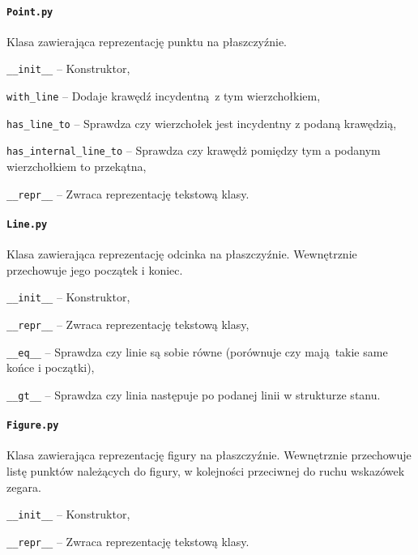 \documentclass[12pt]{article}
\let\tempone\itemize
\let\temptwo\enditemize
\renewenvironment{itemize}{\tempone\setlength{\itemsep}{0cm}}{\temptwo}
\begin{document}
		\paragraph{\lstinline|Point.py|}
			Klasa zawierająca reprezentację punktu na płaszczyźnie.
			\begin{itemize}
				\item \lstinline|__init__| -- Konstruktor,
				\item \lstinline|with_line| -- Dodaje krawędź incydentną z tym wierzchołkiem,
				\item \lstinline|has_line_to| -- Sprawdza czy wierzchołek jest incydentny z podaną krawędzią,
				\item \lstinline|has_internal_line_to| -- Sprawdza czy krawędż pomiędzy tym a podanym wierzchołkiem to przekątna, 
				\item \lstinline|__repr__| -- Zwraca reprezentację tekstową klasy.
			\end{itemize}
			
		\paragraph{\lstinline|Line.py|}
			Klasa zawierająca reprezentację odcinka na płaszczyźnie. Wewnętrznie przechowuje jego początek i koniec.
			\begin{itemize}
				\item \lstinline|__init__| -- Konstruktor,
				\item \lstinline|__repr__| -- Zwraca reprezentację tekstową klasy,
				\item \lstinline|__eq__| -- Sprawdza czy linie są sobie równe (porównuje czy mają takie same końce i początki),
				\item \lstinline|__gt__| -- Sprawdza czy linia następuje po podanej linii w strukturze stanu.
			\end{itemize}
					
		\paragraph{\lstinline|Figure.py|}
			Klasa zawierająca reprezentację figury na płaszczyźnie. Wewnętrznie przechowuje listę punktów należących do figury, w kolejności przeciwnej do ruchu wskazówek zegara.
			\begin{itemize}
				\item \lstinline|__init__| -- Konstruktor,
				\item \lstinline|__repr__| -- Zwraca reprezentację tekstową klasy.
			\end{itemize}
		
\end{document}
